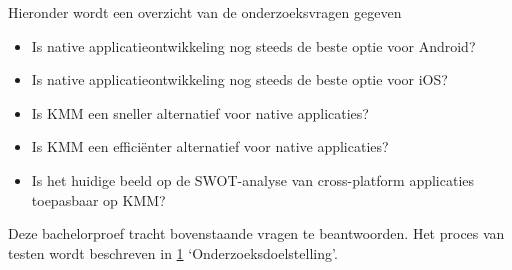 Hieronder wordt een overzicht van de onderzoeksvragen gegeven
\begin{itemize}
    \item Is native applicatieontwikkeling nog steeds de beste optie voor Android?
    \item Is native applicatieontwikkeling nog steeds de beste optie voor iOS?
    \item Is KMM een sneller alternatief voor native applicaties?
    \item Is KMM een efficiënter alternatief voor native applicaties?
    \item Is het huidige beeld op de SWOT-analyse van cross-platform applicaties toepasbaar op KMM?
\end{itemize}

Deze bachelorproef tracht bovenstaande vragen te beantwoorden. Het proces van testen wordt beschreven in \ref{sec:onderzoeksdoelstelling} `Onderzoeksdoelstelling'.

\section{}
\label{sec:onderzoeksdoelstelling}

